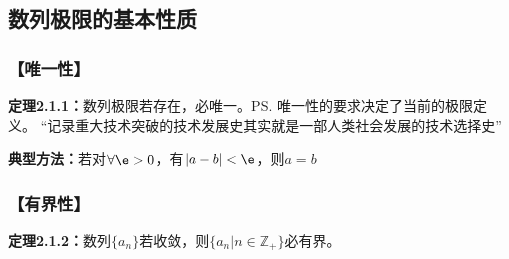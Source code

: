 \subsection{数列极限的基本性质}

\subsubsection{【唯一性】}

{\bf 定理2.1.1：}数列极限若存在，必唯一。\ps{唯一性的要求决定了当前的极限定义。
“记录重大技术突破的技术发展史其实就是一部人类社会发展的技术选择史”}

\begin{center}
\end{center}

{\bf 典型方法：}若对$\forall\e>0$，有$|a-b|<\e$，则$a=b$

\subsubsection{【有界性】}

{\bf 定理2.1.2：}数列$\{a_n\}$若收敛，则$\{a_n|n\in\mathbb{Z}_+\}$必有界。

\begin{center}
\end{center}

